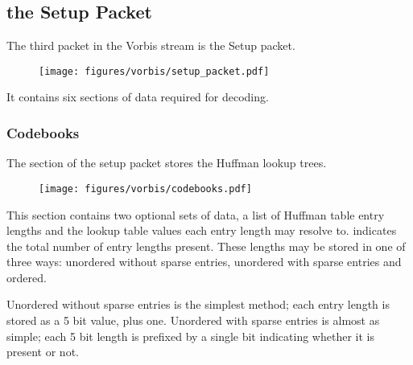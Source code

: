 \clearpage

\subsection{the Setup Packet}

The third packet in the Vorbis stream is the Setup packet.

\begin{figure}[h]
\texttt{[image: figures/vorbis/setup\_packet.pdf]}
\end{figure}

It contains six sections of data required for decoding.

\clearpage

\subsubsection{Codebooks}

The  section of the setup packet stores
the Huffman lookup trees.

\begin{figure}[h]
\texttt{[image: figures/vorbis/codebooks.pdf]}
\end{figure}
\par
\noindent
This section contains two optional sets of data,
a list of Huffman table entry lengths
and the lookup table values each entry length may resolve to.
 indicates the total number of entry lengths present.
These lengths may be stored in one of three ways:
unordered without sparse entries, unordered with sparse entries
and ordered.

Unordered without sparse entries is the simplest method;
each entry length is stored as a 5 bit value, plus one.
Unordered with sparse entries is almost as simple;
each 5 bit length is prefixed by a single bit indicating
whether it is present or not.

